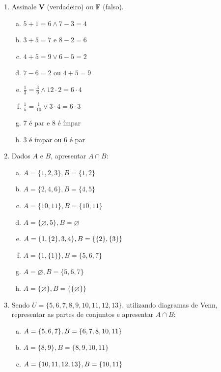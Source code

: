 \documentclass[a4paper,14pt]{article}
\begin{document}
\begin{multicols}{2}
\begin{enumerate}
    				\newpage
    				\item Assinale \textbf{V} (verdadeiro) ou \textbf{F} (falso).
    				\begin{enumerate}[a)]
    					\item $5 + 1 = 6 \land 7 - 3  = 4$
    					\item $3 + 5 = 7$ e $8 - 2 = 6$
    					\item $4 + 5 = 9 \lor 6 - 5 = 2$
    					\item $7 - 6 = 2$ ou $4 + 5 = 9$
    					\item $\frac{1}{3} = \frac{3}{9} \land 12 \cdot 2 = 6 \cdot 4$
    					\item $\frac{1}{5} = \frac{1}{10} \lor 3 \cdot 4 = 6 \cdot 3$
    					\item 7 é par e 8 é ímpar
    					\item 3 é ímpar ou 6 é par
    				\end{enumerate}
    				\item Dados $A$ e $B$, apresentar $A \cap B$:
    				\begin{enumerate}[a)]
    					\item $A = \{1, 2, 3\}, B = \{1, 2\}$
    					\item $A = \{2, 4, 6\}, B = \{4, 5\}$
    					\item $A = \{10, 11\}, B = \{10, 11\}$
    					\item $A = \{\varnothing, 5\}, B = \varnothing$
    					\item $A = \{1, \{2\}, 3, 4\}, \\ B = \{\{2\}, \{3\}\}$
    					\item $A = \{1, \{1\}\}, B = \{5, 6, 7\}$
    					\item $A = \varnothing, B = \{5, 6, 7\}$
    					\item $A = \{\varnothing\}, B = \{\{\varnothing\}\}$
    				\end{enumerate}
    				\item Sendo $U = \{5, 6, 7, 8, 9, 10, 11, 12, 13\}$, utilizando diagramas de Venn, representar as partes de conjuntos e apresentar $A \cap B$:
    				\begin{enumerate}[a)]
    					\item $A = \{5, 6, 7\}, \\ B = \{6, 7, 8, 10, 11\}$
    					\item $A = \{8, 9\}, B = \{8, 9, 10, 11\}$
    					\item $A = \{10, 11, 12, 13\}, \\ B = \{10, 11\}$

\end{enumerate}
\end{enumerate}
\end{multicols}
\end{document}
